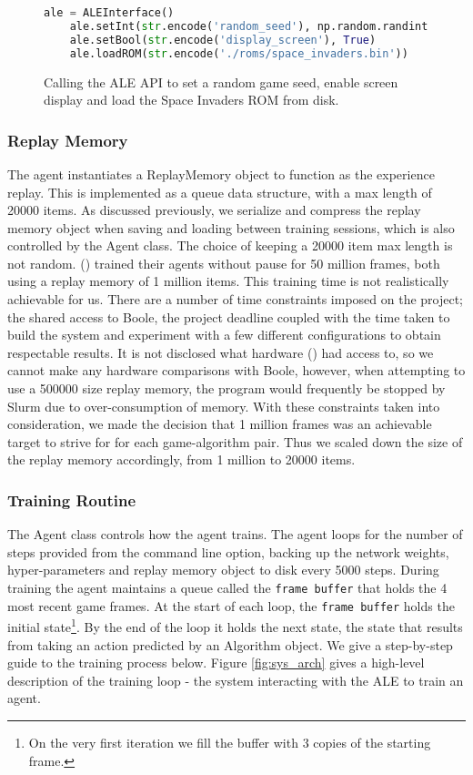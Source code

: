 \begin{figure}[h]
	\centering
	\begin{lstlisting}[language=Python]
    ale = ALEInterface()
    ale.setInt(str.encode('random_seed'), np.random.randint(100))
    ale.setBool(str.encode('display_screen'), True)
    ale.loadROM(str.encode('./roms/space_invaders.bin'))
    \end{lstlisting}
	\caption{Calling the ALE API to set a random game seed, enable screen display and load the Space Invaders ROM from disk.}
	\label{fig:aleflags}
\end{figure}

\subsubsection{Replay Memory} \label{sec:replaymem}
The agent instantiates a ReplayMemory object to function as the experience replay. This is implemented as a queue data structure, with a max length of 20000 items. As discussed previously, we serialize and compress the replay memory object when saving and loading between training sessions, which is also controlled by the Agent class. The choice of keeping a 20000 item max length is not random. (\citet{deepmind1,human}) trained their agents without pause for 50 million frames, both using a replay memory of 1 million items. This training time is not realistically achievable for us. There are a number of time constraints imposed on the project; the shared access to Boole, the project deadline coupled with the time taken to build the system and experiment with a few different configurations to obtain respectable results. It is not disclosed what hardware (\citet{deepmind1,human}) had access to, so we cannot make any hardware comparisons with Boole, however, when attempting to use a 500000 size replay memory, the program would frequently be stopped by Slurm due to over-consumption of memory. With these constraints taken into consideration, we made the decision that 1 million frames was an achievable target to strive for for each game-algorithm pair. Thus we scaled down the size of the replay memory accordingly, from 1 million to 20000 items.

\subsubsection{Training Routine}
The Agent class controls how the agent trains. The agent loops for the number of steps provided from the command line option, backing up the network weights, hyper-parameters and replay memory object to disk every 5000 steps. During training the agent maintains a queue called the \texttt{frame buffer} that holds the 4 most recent game frames. At the start of each loop, the \texttt{frame buffer} holds the initial state\footnote{On the very first iteration we fill the buffer with 3 copies of the starting frame.}. By the end of the loop it holds the next state, the state that results from taking an action predicted by an Algorithm object. We give a step-by-step guide to the training process below. Figure \ref{fig:sys_arch} gives a high-level description of the training loop - the system interacting with the ALE to train an agent.

